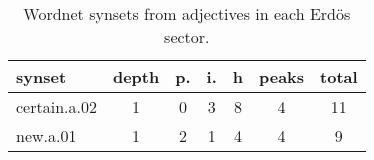 \begin{table}[h!]
\begin{center}
\begin{tabular}{| l || c | c | c | c || c | c |}\hline
{\bf synset} & {\bf depth} & {\bf p.} & {\bf i.} & {\bf h} & {\bf peaks} & {\bf total} \\\hline\hline
certain.a.02 & 1  & 0  & 3  & 8  & 4  & 11 \\
new.a.01 & 1  & 2  & 1  & 4  & 4  & 9 \\\hline
\end{tabular}
\caption{Wordnet synsets from adjectives in each Erd\"os sector.}
\end{center}
\end{table}